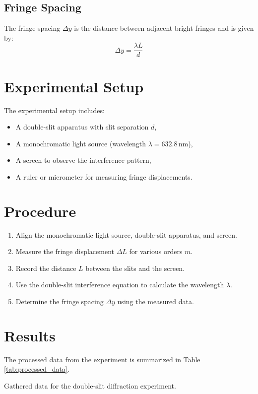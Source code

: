 \documentclass[journal]{IEEEtran}
\begin{document}
\subsection{Fringe Spacing}
The fringe spacing $\Delta y$ is the distance between adjacent bright fringes and is given by:
\begin{equation}
    \Delta y = \frac{\lambda L}{d}
    \label{eq:fringe_spacing}
\end{equation}

\section{Experimental Setup}
The experimental setup includes:
\begin{itemize}
    \item A double-slit apparatus with slit separation $d$,
    \item A monochromatic light source (wavelength $\lambda = 632.8 \, \text{nm}$),
    \item A screen to observe the interference pattern,
    \item A ruler or micrometer for measuring fringe displacements.
\end{itemize}

\section{Procedure}
\begin{enumerate}
    \item Align the monochromatic light source, double-slit apparatus, and screen.
    \item Measure the fringe displacement $\Delta L$ for various orders $m$.
    \item Record the distance $L$ between the slits and the screen.
    \item Use the double-slit interference equation to calculate the wavelength $\lambda$.
    \item Determine the fringe spacing $\Delta y$ using the measured data.
\end{enumerate}

\section{Results}
The processed data from the experiment is summarized in Table \ref{tab:processed_data}.

\begin{table*}[t]
    \centering
    \caption{Gathered data for the double-slit diffraction experiment.}
    \label{tab:processed_data}
\end{table*}
\end{document}
